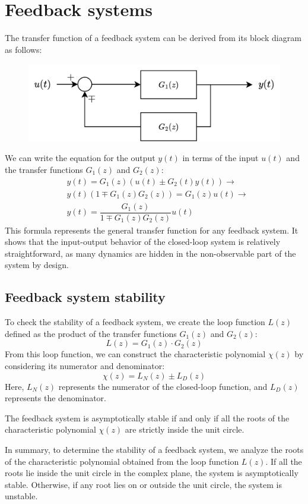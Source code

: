 \section{Feedback systems}

The transfer function of a feedback system can be derived from its block diagram as follows:
\begin{figure}[H]
    \centering
    \includegraphics[width=0.6\linewidth]{images/feedback.png}
\end{figure}
We can write the equation for the output $y(t)$ in terms of the input $u(t)$ and the transfer functions $G_1(z)$ and $G_2(z)$:
\begin{align*}
    &y(t)=G_1(z)\left(u(t)\pm G_2(t)y(t)\right) \rightarrow \\
    &y(t)\left(1 \mp G_1(z)G_2(z)\right)=G_1(z)u(t) \rightarrow \\
    &y(t)=\dfrac{G_1(z)}{1 \mp G_1(z)G_2(z)}u(t)
\end{align*}
This formula represents the general transfer function for any feedback system. 
It shows that the input-output behavior of the closed-loop system is relatively straightforward, as many dynamics are hidden in the non-observable part of the system by design. 

\subsection{Feedback system stability}
To check the stability of a feedback system, we create the loop function $L(z)$ defined as the product of the transfer functions $G_1(z)$ and $G_2(z)$:
\[L(z)=G_1(z)\cdot G_2(z)\]
From this loop function, we can construct the characteristic polynomial $\chi(z)$ by considering its numerator and denominator:
\[\chi(z)=L_{N}(z)\pm L_D(z)\]
Here, $L_{N}(z)$ represents the numerator of the closed-loop function, and $L_{D}(z)$ represents the denominator.
\begin{theorem}
    The feedback system is asymptotically stable if and only if all the roots of the characteristic polynomial $\chi(z)$ are strictly inside the unit circle.
\end{theorem}
In summary, to determine the stability of a feedback system, we analyze the roots of the characteristic polynomial obtained from the loop function $L(z)$. 
If all the roots lie inside the unit circle in the complex plane, the system is asymptotically stable. 
Otherwise, if any root lies on or outside the unit circle, the system is unstable.